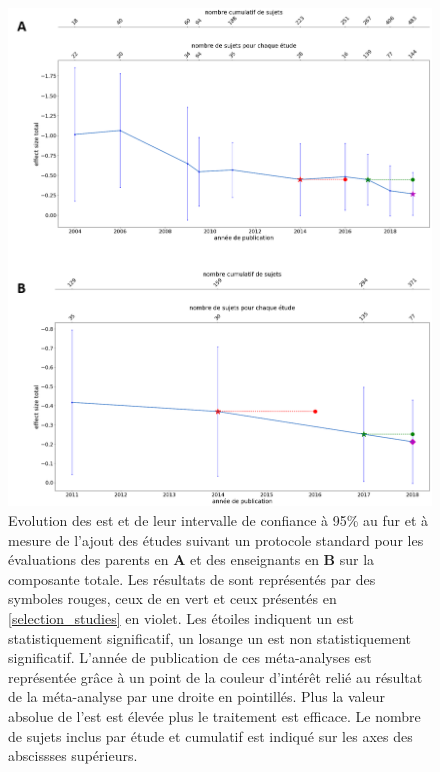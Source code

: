 \begin{itemize}
\begin{figure}[h!]
  \centering
	\includegraphics[width=1\linewidth]{figures/chapter-2/meta-analysis-evolution-summary-effect-std} 
  \caption{Evolution des \gls{est} et de leur intervalle de confiance à 95\% au fur et à mesure de l'ajout des études suivant un protocole standard pour les évaluations des 
	parents en \textbf{A} et des enseignants en \textbf{B} sur la composante totale.
  Les résultats de \citep{Cortese2016} sont représentés par des symboles rouges, ceux de \citet{Bussalb2019clinical} en vert et ceux présentés en \ref{selection_studies} en violet. Les étoiles 
	indiquent un \gls{est} statistiquement significatif, un losange un \gls{est} non statistiquement significatif. L'année de publication de ces méta-analyses est représentée grâce à un point de la couleur 
	d'intérêt relié au résultat de la méta-analyse par une droite en pointillés.
	Plus la valeur absolue de l'\gls{est} est élevée plus le traitement est efficace.
	Le nombre de sujets inclus par étude et cumulatif est indiqué sur les axes des abscissses supérieurs.}
  \label{Figure:meta_analysis_evolution_est_std}
\end{figure}


\end{itemize}
